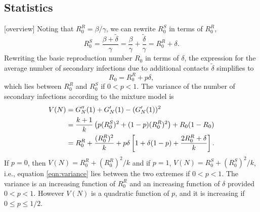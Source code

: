 \documentclass{imammb}
\numberwithin{equation}{section}
\begin{document}
\subsection{Statistics} %
[overview]
Noting that $R_0^R = \beta/\gamma$,  we can rewrite $R_0^S$ in terms of $R_0^R$,
\begin{equation}
R_0^S = \frac{\beta + \tilde{\delta}}{\gamma} = \frac{\beta}{\gamma} + \frac{ \tilde{\delta}}{\gamma} = R_0^R + \delta. 
\end{equation}
Rewriting the basic reproduction number $R_0$ in terms of $\delta$, the expression for the average number of secondary infections due to additional contacts $\tilde{\delta}$ simplifies to 
\begin{equation}\label{eqn:R0delta}
R_0 = R_0^R + p \delta,
\end{equation}
which lies between $R_0^R$ and $R_0^S$ if $0<p<1$. 
The variance of the number of secondary infections according to the mixture model is %
\begin{align}\label{eqn:variance}
V(N) &= G_N''(1) + G_N'(1) -  (G_N'(1))^2 \notag \\ &= \frac{k+1}{k} \left (p (R_0^S)^2 + (1-p) (R_0^R)^2  \right ) +R_0(1-R_0)\notag\\ &=R_0^R + \frac{(R_0^R)^2}{k} + p \delta \left [ 1+ \delta(1-p) + \frac{2 R_0^R + \delta}{k} \right ]. 
\end{align}
If $p=0$, then $V(N) = R_0^R + (R_0^R)^2/k$ and if $p=1$, $V(N) = R_0^S + (R_0^S)^2/k$, i.e., equation \eqref{eqn:variance} lies between the two extremes if $0<p<1$. The variance is an increasing function of $R_0^R$ and an increasing function of $\delta$ provided $0<p<1$. However $V(N)$ is a quadratic function of $p$, and it is increasing if $0\leq p \leq 1/2$.

\end{document}
